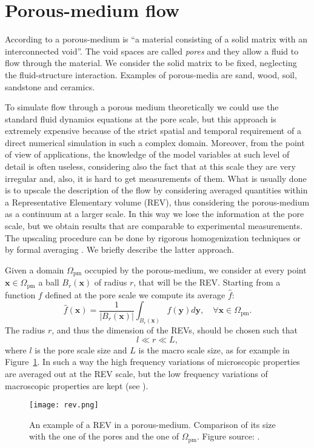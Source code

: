 \section{Porous-medium flow} \label{sec:pm}
According to \cite{forch:nield} a porous-medium is ``a material consisting of a 
solid matrix with an interconnected void''. The void spaces are called 
\emph{pores} and they allow a fluid to flow through the material. We consider the 
solid matrix to be fixed, neglecting the fluid-structure interaction. Examples 
of porous-media are sand, wood, soil, 
sandstone and ceramics.

To simulate flow through a porous medium theoretically we could use 
the standard fluid dynamics equations at the pore scale, but this approach is
extremely expensive because of the strict spatial and temporal requirement of a direct numerical simulation in such a complex domain. Moreover, from the point of view of applications, the knowledge of the model variables at such level of detail is often useless, considering also the fact that at this scale they are very irregular and, also, it is hard to get measurements of them.
What is usually done is to 
upscale the description of the flow by considering averaged quantities within a 
Representative Elementary volume (REV), thus considering the 
porous-medium as a continuum at a larger scale. In this way we lose the 
information at the pore scale, but we obtain results that 
are comparable to experimental measurements. The upscaling procedure can be done by rigorous homogenization techniques \cite{homo:allaire} or by formal averaging \cite{volaver:withakerbook}. We briefly describe the latter approach.

Given a domain $\Omega_\text{pm}$ occupied by the porous-medium, we consider 
at every point $\mathbf{x} \in \Omega_\text{pm}$ a ball $B_r(\mathbf{x})$ of 
radius $r$, that will be the REV. Starting from a function $f$ defined at the 
pore scale we compute its average $\hat{f}$:
\begin{equation}
	\hat{f}(\mathbf{x}) = \frac{1}{|B_r(\mathbf{x})|} \int_{B_r(\mathbf{x})} 
	f(\mathbf{y}) d\mathbf{y}, \quad \forall \mathbf{x} \in \Omega_\text{pm}.
\end{equation}
The radius $r$, and thus the dimension of the REVs, should be chosen such that
\begin{equation}
	l \ll r \ll L,
\end{equation}
where $l$ is the pore scale size and $L$ is the macro scale size, as for 
example in Figure~\ref{fig:rev}. In such a way 
the high frequency variations of microscopic properties are averaged out at the REV scale, but the low frequency variations of macroscopic properties are kept (see \cite{main:helmig}).
\begin{figure}
	\centering
	\texttt{[image: rev.png]}
	\caption[REV in a porous-medium]{An example of a REV in a porous-medium. 
	Comparison of its size with the one of the pores and the one of 
	$\Omega_\text{pm}$. Figure source: \cite{forch:nield}.}
	\label{fig:rev}
\end{figure}

